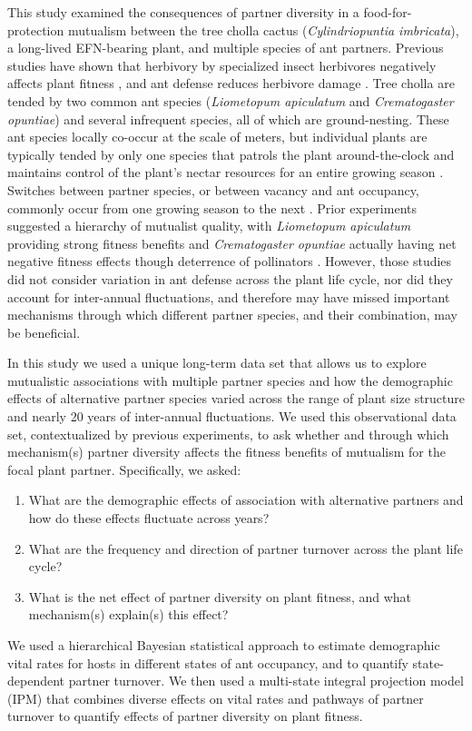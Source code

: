 \documentclass[11pt]{article}
\begin{document}
This study examined the consequences of partner diversity in a food-for-protection mutualism between the tree cholla cactus (\textit{Cylindriopuntia imbricata}), a long-lived EFN-bearing plant, and multiple species of ant partners.
Previous studies have shown that herbivory by specialized insect herbivores negatively affects plant fitness \cite{Miller2009}, and ant defense reduces herbivore damage \cite{Miller2007}. 
Tree cholla are tended by two common ant species (\textit{Liometopum apiculatum} and \textit{Crematogaster opuntiae}) and several infrequent species, all of which are ground-nesting. 
These ant species locally co-occur at the scale of meters, but individual plants are typically tended by only one species that patrols the plant around-the-clock and maintains control of the plant's nectar resources for an entire growing season \citep{Ohm2014,donald2022does}. 
Switches between partner species, or between vacancy and ant occupancy, commonly occur from one growing season to the next \citep{Miller2007}. 
Prior experiments suggested a hierarchy of mutualist quality, with \textit{Liometopum apiculatum} providing strong fitness benefits and \textit{Crematogaster opuntiae} actually having net negative fitness effects though deterrence of pollinators \citep{Miller2007,Ohm2014}. 
However, those studies did not consider variation in ant defense across the plant life cycle, nor did they account for inter-annual fluctuations, and therefore may have missed important mechanisms through which different partner species, and their combination, may be beneficial. 

In this study we used a unique long-term data set that allows us to explore mutualistic associations with multiple partner species and how the demographic effects of alternative partner species varied across the range of plant size structure and nearly 20 years of inter-annual fluctuations. 
We used this observational data set, contextualized by previous experiments, to ask whether and through which mechanism(s) partner diversity affects the fitness benefits of mutualism for the focal plant partner. 
Specifically, we asked:
\begin{enumerate}	
	\item{What are the demographic effects of association with alternative partners and how do these effects fluctuate across years?}
	\item{What are the frequency and direction of partner turnover across the plant life cycle?}	
	\item{What is the net effect of partner diversity on plant fitness, and what mechanism(s) explain(s) this effect?}
\end{enumerate}
We used a hierarchical Bayesian statistical approach to estimate demographic vital rates for hosts in different states of ant occupancy, and to quantify state-dependent partner turnover. 
We then used a multi-state integral projection model (IPM) that combines diverse effects on vital rates and pathways of partner turnover to quantify effects of partner diversity on plant fitness. 
\end{document}
